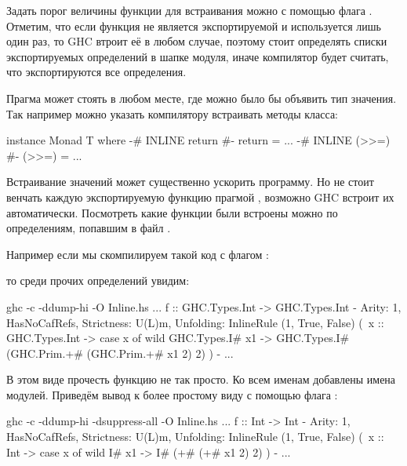 Задать порог величины функции для встраивания можно с помощью флага
. Отметим, что если функция не является
экспортируемой и используется лишь один раз, то GHC втроит её в любом
случае, поэтому стоит определять списки экспортируемых определений в
шапке модуля, иначе компилятор будет считать, что экспортируются все
определения.

Прагма  может стоять в любом месте, где можно было бы
объявить тип значения. Так например можно указать компилятору встраивать
методы класса:


\begin{code}
instance Monad T where
    {-# INLINE return #-}
    return = ...
    {-# INLINE (>>=) #-}
    (>>=)  = ...
\end{code}

Встраивание значений может существенно ускорить программу. Но не стоит
венчать каждую экспортируемую функцию прагмой , возможно GHC
встроит их автоматически. Посмотреть какие функции были встроены можно
по определениям, попавшим в файл .

Например если мы скомпилируем такой код с флагом :



\noindent 

то среди прочих определений увидим:


\begin{code}
ghc -c -ddump-hi -O Inline.hs
...
  f :: GHC.Types.Int -> GHC.Types.Int
    {- Arity: 1, HasNoCafRefs, Strictness: U(L)m,
       Unfolding: InlineRule (1, True, False)
                  (\ x :: GHC.Types.Int ->
                   case x of wild { GHC.Types.I# x1 ->
                   GHC.Types.I# (GHC.Prim.+# (GHC.Prim.+# x1 2) 2) }) -}
...
\end{code}

В этом виде прочесть функцию не так просто. Ко всем именам добавлены
имена модулей. Приведём вывод к более простому виду с помощью флага
:


\begin{code}
ghc -c -ddump-hi -dsuppress-all -O Inline.hs
...
f :: Int -> Int
    {- Arity: 1, HasNoCafRefs, Strictness: U(L)m,
       Unfolding: InlineRule (1, True, False)
       (\ x :: Int -> case x of wild { I# x1 -> I# (+# (+# x1 2) 2) }) -}
...
\end{code}

